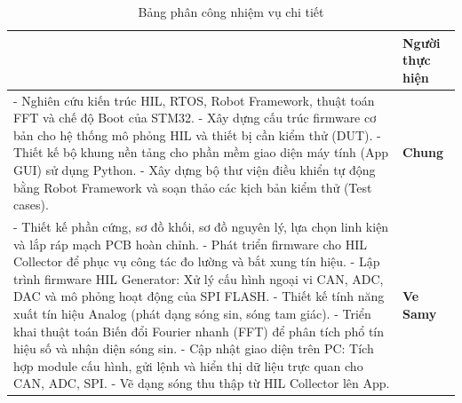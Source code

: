 \begingroup
\renewcommand{\arraystretch}{1.4} 
\begin{longtable}{|>{\raggedright\arraybackslash}p{10.7cm} |>{\centering\arraybackslash}p{2.5cm}|}
    \caption{Bảng phân công nhiệm vụ chi tiết}
    \label{tab:phan_cong} \\
    \hline
    \multicolumn{1}{|c|}{\textbf{Chi tiết công việc}} & \textbf{Người thực hiện} \\
    \hline
    \endfirsthead
    
    \hline
    \endhead
    
    \endfoot
    
    \hline
    \endlastfoot


    - Nghiên cứu kiến trúc HIL, RTOS, Robot Framework, thuật toán FFT và chế độ Boot của STM32.\newline
    - Xây dựng cấu trúc firmware cơ bản cho hệ thống mô phỏng HIL và thiết bị cần kiểm thử (DUT).\newline
    - Thiết kế bộ khung nền tảng cho phần mềm giao diện máy tính (App GUI) sử dụng Python.\newline
    - Xây dựng bộ thư viện điều khiển tự động bằng Robot Framework và soạn thảo các kịch bản kiểm thử (Test cases). & 
    \textbf{Chung} \\
    \hline
    
    - Thiết kế phần cứng, sơ đồ khối, sơ đồ nguyên lý, lựa chọn linh kiện và lắp ráp mạch PCB hoàn chỉnh.\newline
    - Phát triển firmware cho HIL Collector để phục vụ công tác đo lường và bắt xung tín hiệu.\newline
    - Lập trình firmware HIL Generator: Xử lý cấu hình ngoại vi CAN, ADC, DAC và mô phỏng hoạt động của SPI FLASH.\newline
    - Thiết kế tính năng xuất tín hiệu Analog (phát dạng sóng sin, sóng tam giác).\newline
    - Triển khai thuật toán Biến đổi Fourier nhanh (FFT) để phân tích phổ tín hiệu số và nhận diện sóng sin.\newline
    - Cập nhật giao diện trên PC: Tích hợp module cấu hình, gửi lệnh và hiển thị dữ liệu trực quan cho CAN, ADC, SPI. \newline
    - Vẽ dạng sóng thu thập từ HIL Collector lên App. &
    \textbf{Ve Samy} \\
    \hline


\end{longtable}
